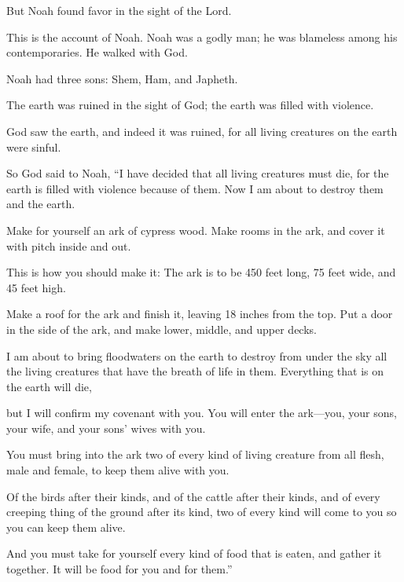 \begin{scripture}
 But Noah found favor in the sight of the Lord.
\everypar{}

 This is the account of Noah. Noah was a godly man; he was blameless among his contemporaries. He walked with God.
 Noah had three sons: Shem, Ham, and Japheth.
\everypar{}

 The earth was ruined in the sight of God; the earth was filled with violence.
 God saw the earth, and indeed it was ruined, for all living creatures on the earth were sinful.
 So God said to Noah, ``I have decided that all living creatures must die, for the earth is filled with violence because of them. Now I am about to destroy them and the earth.
 Make for yourself an ark of cypress wood. Make rooms in the ark, and cover it with pitch inside and out.
 This is how you should make it: The ark is to be 450 feet long, 75 feet wide, and 45 feet high.
 Make a roof for the ark and finish it, leaving 18 inches from the top. Put a door in the side of the ark, and make lower, middle, and upper decks.
 I am about to bring floodwaters on the earth to destroy from under the sky all the living creatures that have the breath of life in them. Everything that is on the earth will die,
 but I will confirm my covenant with you. You will enter the ark---you, your sons, your wife, and your sons' wives with you.
 You must bring into the ark two of every kind of living creature from all flesh, male and female, to keep them alive with you.
 Of the birds after their kinds, and of the cattle after their kinds, and of every creeping thing of the ground after its kind, two of every kind will come to you so you can keep them alive.
 And you must take for yourself every kind of food that is eaten, and gather it together. It will be food for you and for them.''
\everypar{}


\end{scripture}
